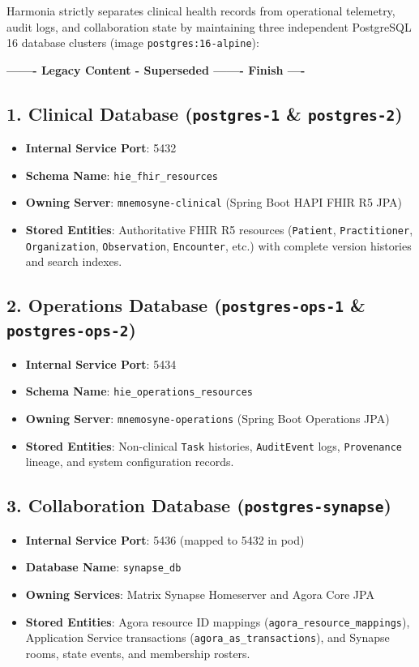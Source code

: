 Harmonia strictly separates clinical health records from operational telemetry, audit logs, and collaboration state by maintaining three independent PostgreSQL 16 database clusters (image \texttt{postgres:16-alpine}):

\par\noindent\textbf{------- Legacy Content - Superseded ------- Finish ----}


\subsection{1. Clinical Database (\texttt{postgres-1} \& \texttt{postgres-2})}
\begin{itemize}
    \item \textbf{Internal Service Port}: 5432
    \item \textbf{Schema Name}: \texttt{hie\_fhir\_resources}
    \item \textbf{Owning Server}: \texttt{mnemosyne-clinical} (Spring Boot HAPI FHIR R5 JPA)
    \item \textbf{Stored Entities}: Authoritative FHIR R5 resources (\texttt{Patient}, \texttt{Practitioner}, \texttt{Organization}, \texttt{Observation}, \texttt{Encounter}, etc.) with complete version histories and search indexes.
\end{itemize}

\subsection{2. Operations Database (\texttt{postgres-ops-1} \& \texttt{postgres-ops-2})}
\begin{itemize}
    \item \textbf{Internal Service Port}: 5434
    \item \textbf{Schema Name}: \texttt{hie\_operations\_resources}
    \item \textbf{Owning Server}: \texttt{mnemosyne-operations} (Spring Boot Operations JPA)
    \item \textbf{Stored Entities}: Non-clinical \texttt{Task} histories, \texttt{AuditEvent} logs, \texttt{Provenance} lineage, and system configuration records.
\end{itemize}

\subsection{3. Collaboration Database (\texttt{postgres-synapse})}
\begin{itemize}
    \item \textbf{Internal Service Port}: 5436 (mapped to 5432 in pod)
    \item \textbf{Database Name}: \texttt{synapse\_db}
    \item \textbf{Owning Services}: Matrix Synapse Homeserver and Agora Core JPA
    \item \textbf{Stored Entities}: Agora resource ID mappings (\nolinkurl{agora_resource_mappings}), Application Service transactions (\nolinkurl{agora_as_transactions}), and Synapse rooms, state events, and membership rosters.
\end{itemize}


